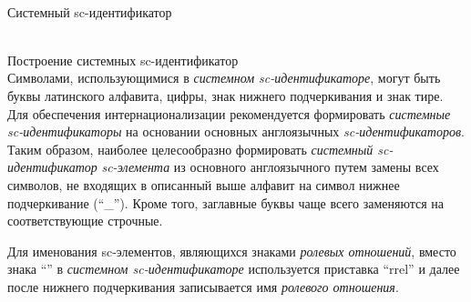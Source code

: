 \begin{frame}{\\Системный sc-идентификатор}
	\topline
	\justifying
	\begin{SCn}
	\end{SCn}
	
\end{frame}

\begin{frame}{\\Построение системных sc-идентификатор}
	\topline
	\justifying
	\vspace*{\fill}\\
	Символами, использующимися в \textit{системном sc-идентификаторе}, могут быть буквы латинского алфавита, цифры, знак нижнего подчеркивания и знак тире. Для обеспечения интернационализации рекомендуется формировать \textit{системные sc-идентификаторы} на основании основных англоязычных \textit{sc-идентификаторов}. Таким образом, наиболее целесообразно формировать \textit{системный sc-идентификатор} \textit{sc-элемента} из основного англоязычного путем замены всех символов, не входящих в описанный выше алфавит на символ нижнее подчеркивание (``\_''). Кроме того, заглавные буквы чаще всего заменяются на соответствующие строчные.
	
	Для именования sc-элементов, являющихся знаками \textit{ролевых отношений}, вместо знака ``\scnrolesign'' в \textit{системном sc-идентификаторе} используется приставка ``rrel'' и далее после нижнего подчеркивания записывается имя \textit{ролевого отношения}.
	
\end{frame}

